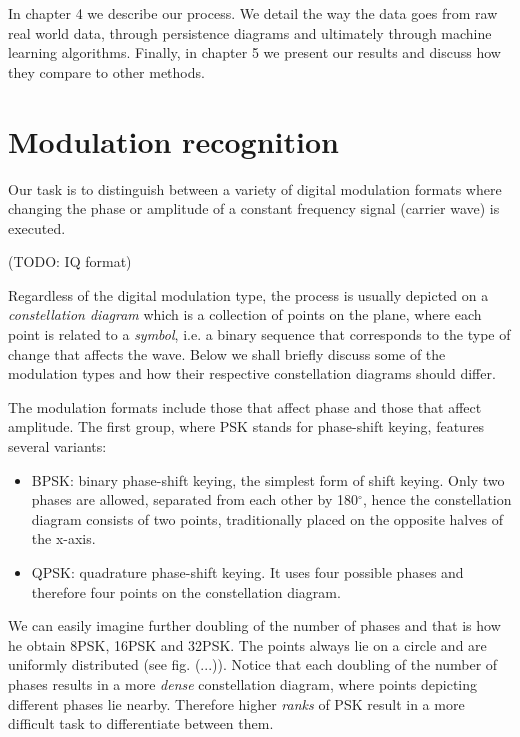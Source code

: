 \documentclass[12pt]{article}
\theoremstyle{plain}
\theoremstyle{definition}
\theoremstyle{remark}
\begin{document}
	In chapter 4 we describe our process. We detail the way the data goes from raw real world data, through persistence diagrams and ultimately through machine learning algorithms. Finally, in chapter 5 we present our results and discuss how they compare to other methods.
	
	\section{Modulation recognition}
	
	Our task is to distinguish between a variety of digital modulation formats where changing the phase or amplitude of a constant frequency signal (carrier wave) is executed.
	
	(TODO: IQ format)
	
	Regardless of the digital modulation type, the process is usually depicted on a \textit{constellation diagram} which is a collection of points on the plane, where each point is related to a \textit{symbol}, i.e. a binary sequence that corresponds to the type of change that affects the wave. Below we shall briefly discuss some of the modulation types and how their respective constellation diagrams should differ.
	
	The modulation formats include those that affect phase and those that affect amplitude. The first group, where PSK stands for phase-shift keying, features several variants:
	\begin{itemize}
		\item BPSK: binary phase-shift keying, the simplest form of shift keying. Only two phases are allowed, separated from each other by 180$^\circ$, hence the constellation diagram consists of two points, traditionally placed on the opposite halves of the x-axis.
		\item QPSK: quadrature phase-shift keying. It uses four possible phases and therefore four points on the constellation diagram.
	\end{itemize}
We can easily imagine further doubling of the number of phases and that is how he obtain 8PSK, 16PSK and 32PSK. The points always lie on a circle and are uniformly distributed (see fig. (...)). Notice that each doubling of the number of phases results in a more \textit{dense} constellation diagram, where points depicting different phases lie nearby. Therefore higher \textit{ranks} of PSK result in a more difficult task to differentiate between them.
\end{document}
